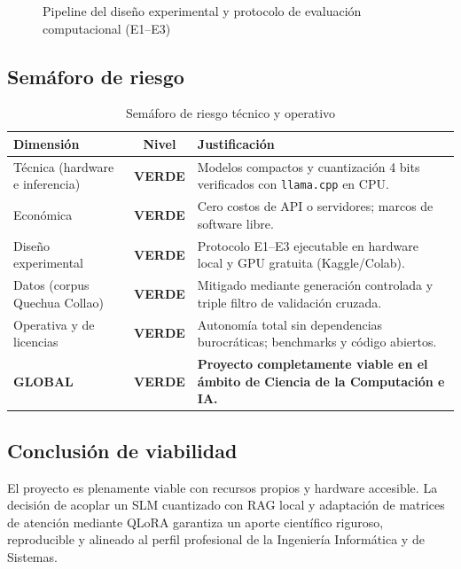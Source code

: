 \begin{figure}[H]
{}
\caption{Pipeline del diseño experimental y protocolo de evaluación computacional (E1--E3)}
\label{fig:pipeline_evaluacion}
\end{figure}

\subsection{Semáforo de riesgo}

\begin{table}[H]
\centering
\caption{Semáforo de riesgo técnico y operativo}
\label{tab:semaforo}
\small
\begin{tabular}{@{}p{4.5cm}cp{8cm}@{}}
\toprule
\textbf{Dimensión} & \textbf{Nivel} & \textbf{Justificación} \\
\midrule
Técnica (hardware e inferencia) & \cellcolor{tcVerde!35}\textbf{VERDE} & Modelos compactos y cuantización 4 bits verificados con \texttt{llama.cpp} en CPU. \\
\midrule
Económica & \cellcolor{tcVerde!35}\textbf{VERDE} & Cero costos de API o servidores; marcos de software libre. \\
\midrule
Diseño experimental & \cellcolor{tcVerde!35}\textbf{VERDE} & Protocolo E1--E3 ejecutable en hardware local y GPU gratuita (Kaggle/Colab). \\
\midrule
Datos (corpus Quechua Collao) & \cellcolor{tcVerde!35}\textbf{VERDE} & Mitigado mediante generación controlada y triple filtro de validación cruzada. \\
\midrule
Operativa y de licencias & \cellcolor{tcVerde!35}\textbf{VERDE} & Autonomía total sin dependencias burocráticas; benchmarks y código abiertos. \\
\midrule
\textbf{GLOBAL} & \cellcolor{tcVerde!35}\textbf{VERDE} & \textbf{Proyecto completamente viable en el ámbito de Ciencia de la Computación e IA.} \\
\bottomrule
\end{tabular}
\end{table}

\subsection{Conclusión de viabilidad}
El proyecto es plenamente viable con recursos propios y hardware accesible. La decisión de acoplar un SLM cuantizado con RAG local y adaptación de matrices de atención mediante QLoRA garantiza un aporte científico riguroso, reproducible y alineado al perfil profesional de la Ingeniería Informática y de Sistemas.
